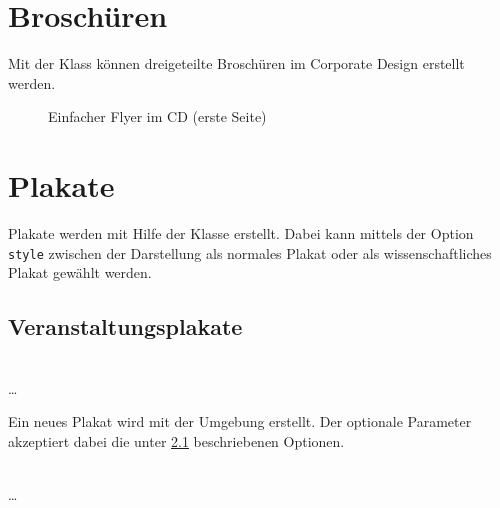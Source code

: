 \documentclass[a4paper,11pt]{tubsreprt}
\begin{document}



\chapter{Broschüren}

Mit der Klass  können dreigeteilte Broschüren
im Corporate Design erstellt werden.

\begin{figure}[!ht]
  \caption{Einfacher Flyer im CD (erste Seite)}
\end{figure}



\chapter{Plakate}

Plakate werden mit Hilfe der Klasse  erstellt.
Dabei kann mittels der Option \texttt{style} zwischen der Darstellung als
normales Plakat oder als wissenschaftliches Plakat gewählt werden.

\section{Veranstaltungsplakate}

\begin{Declaration}
    \\
  \quad\dots\\
\end{Declaration}

Ein neues Plakat wird mit der Umgebung  erstellt.
Der optionale Parameter  akzeptiert dabei die
unter \ref{} beschriebenen Optionen.

\begin{Declaration}
    \\%
  \quad\dots\\
\end{Declaration}
\end{document}
